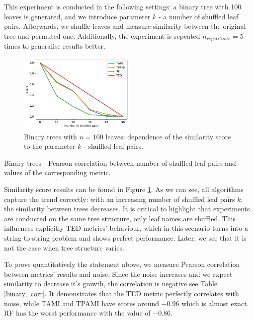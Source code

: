 This experiment is conducted in the following settings: a binary tree with 100 leaves is generated, and we introduce parameter $k$ - a number of shuffled leaf pairs. Afterwards, we shuffle leaves and measure similarity between the original tree and permuted one. Additionally, the experiment is repeated $n_{repetitions}=5$ times to generalise results better.  

\begin{figure}[H]
	\begin{center}
		\includegraphics[width=0.5\textwidth]{figures/1-syntatic-trees-binary.pdf}
		\caption{Binary trees with $n=100$ leaves: dependence of the similarity score to the parameter $k$ - shuffled leaf pairs. \label{fig:res}}
		\label{fig:binary_tree_shuffled}
	\end{center}
\end{figure}


\begin{table}[H]
	\begin{center}
		\caption{Binary trees - Pearson correlation between number of shuffled leaf pairs and values of the corresponding metric. \label{binary_corr}}
		
	\end{center}
\end{table}


Similarity score results can be found in Figure \ref{fig:binary_tree_shuffled}. As we can see, all algorithms capture the trend correctly: with an increasing number of shuffled leaf pairs $k$, the similarity between trees decreases. It is critical to highlight that experiments are conducted on the same tree structure, only leaf names are shuffled. This influences explicitly TED metrics' behaviour, which in this scenario turns into a string-to-string problem and shows perfect performance. Later, we see that it is not the case when tree structure varies.         

To prove quantitatively the statement above, we measure Pearson correlation between metrics' results and noise. Since the noise increases and we expect similarity to decrease it's growth, the correlation is negative see Table \ref{binary_corr}. It demonstrates that the TED metric perfectly correlates with noise, while TAMI and TPAMI have scores around $-0.96$ which is almost exact. RF has the worst performance with the value of $-0.86$.

